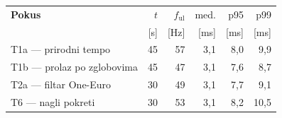 \begin{tabular}{l rrrrr}
\hline
\textbf{Pokus} & \small $t$ & \small $f_\text{ul}$ & \small med. & \small p95 & \small p99 \\
 & \small [s] & \small [Hz] & \small [ms] & \small [ms] & \small [ms] \\
\hline
T1a --- prirodni tempo & 45 & 57 & 3,1 & 8,0 & 9,9 \\
T1b --- prolaz po zglobovima & 45 & 47 & 3,1 & 7,6 & 8,7 \\
T2a --- filtar One-Euro & 30 & 49 & 3,1 & 7,7 & 9,1 \\
T6 --- nagli pokreti & 30 & 53 & 3,1 & 8,2 & 10,5 \\
\hline
\end{tabular}
